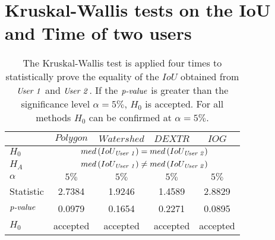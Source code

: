 
\chapter{Kruskal-Wallis tests on the IoU and Time of two users}


\begin{table}[h!]
	\centering
	\begin{tabular}{l|c c c c}
		\toprule 		
							& $ Polygon $	&  $ Watershed $  	&  $ DEXTR $ 	& $ IOG $ \\
		\midrule
		$ H_{0} $			& \multicolumn{4}{c}{$ med \left( IoU_{\textnormal{\textit{User 1}}} \right) = med \left( IoU_{\textnormal{\textit{User 2}}} \right) $ }  \\  
		$ H_{A} $		 	& \multicolumn{4}{c}{$ med \left( IoU_{\textnormal{\textit{User 1}}} \right) \not= med \left( IoU_{\textnormal{\textit{User 2}}} \right) $}  \\ 	
		$ \alpha $		 	& $ 5\% $ 		&  $ 5\% $ 			&  $ 5\% $ 		& $ 5\% $	\\ 	
		Statistic		 	&  2.7384		&  1.9246 			&  1.4589		& 2.8829 	\\ 
		$ \textnormal{\textit{p-value}} $
							& 0.0979		&  0.1654			&  0.2271		& 0.0895	\\
		$ H_{0} $		  	&  accepted 	&  accepted	  		&  accepted 	& accepted  \\ 										
		\bottomrule
	\end{tabular}
	\caption[Kruskal-Wallis on $ IoU $ from two users]{
		The Kruskal-Wallis test is applied four times to statistically prove the equality of the $ IoU $ obtained from $ \textnormal{\textit{User 1}} $ and $ \textnormal{\textit{User 2}} $.
		If the $ \textnormal{\textit{p-value}} $ is greater than the significance level $ \alpha = 5\% $, $ H_{0} $ is accepted.
		For all methods $ H_{0} $ can be confirmed at $ \alpha = 5\% $.	  
	}\label{tab:appendix:afe_cmo_kruskal_wallis_iou}
\end{table}

